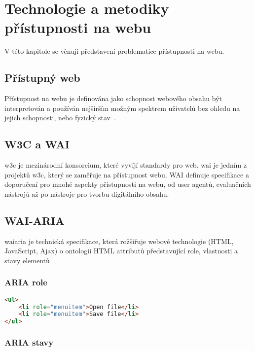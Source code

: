 \chapter{Technologie a metodiky přístupnosti na webu}

V této kapitole se věnuji představení problematice přístupnosti na webu.

\section{Přístupný web}

Přístupnost na webu je definována jako schopnost webového obsahu být interpretován a používán nejširším možným spektrem uživatelů bez ohledu na jejich schopnosti, nebo fyzický stav~\cite{w3-accessibility}.

\section{W3C a WAI}


\gls{w3c} je mezinárodní konsorcium, které vyvíjí standardy pro web.
\gls{wai} je jedním z projektů \gls{w3c}, který se zaměřuje na přístupnost webu.
WAI definuje specifikace a doporučení pro mnohé aspekty přístupnosti na webu, od user agentů, evaluačních nástrojů až po nástroje pro tvorbu digitálního obsahu.

\section{WAI-ARIA}

\gls{waiaria} je technická specifikace, která rožšiřuje webové technologie (HTML, JavaScript, Ajax) o ontologii HTML attributů představující role, vlastnosti a stavy elementů~\cite{wai-aria}.

\subsection{ARIA role}

\begin{lstlisting}[caption={Ukázka aria rolí}, label={lst:example}, language=html]
<ul>
    <li role="menuitem">Open file</li>
    <li role="menuitem">Save file</li>
</ul>
\end{lstlisting}

\subsection{ARIA stavy}

